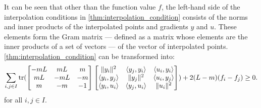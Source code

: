 It can be seen that other than the function value $f$, the left-hand side of the interpolation conditions in \cref{thm:interpolation_condition} consists of the norms and inner products of the interpolated points and gradients $y$ and $u$. These elements form the Gram matrix --- defined as a matrix whose elements are the inner products of a set of vectors --- of the vector of interpolated points. \cref{thm:interpolation_condition} can be transformed into:
\begin{equation} \label{eqn:condGram}
	\sum_{i,j\in I} \operatorname{\mathrm{tr}}(\begin{bmatrix}-mL & mL & m \\ mL & -mL & -m\\m & -m & -1\end{bmatrix}\begin{bmatrix}\|y_i\|^2 & \langle y_j, y_i \rangle & \langle u_i, y_i \rangle \\ \langle y_i, y_j \rangle & \|y_j\|^2 & \langle u_i, y_j \rangle \\ \langle y_i, u_i \rangle & \langle y_j, u_i \rangle & \|u_i\|^2\end{bmatrix}) + 2(L-m)(f_i - f_j) \geq 0.
\end{equation}
for all $i,j\in I$.


